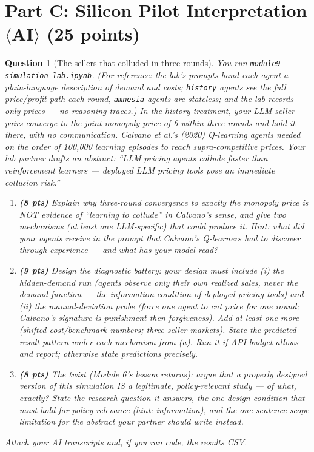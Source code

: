 \documentclass[11pt]{article}
\newtheorem{question}{Question}
\begin{document}
\section*{Part C: Silicon Pilot Interpretation $\langle$AI$\rangle$
(25 points)}

\begin{question}[The sellers that colluded in three rounds]
You run \texttt{module9-simulation-lab.ipynb}. (For reference: the
lab's prompts hand each agent a plain-language description of demand
and costs; \texttt{history} agents see the full price/profit path each
round, \texttt{amnesia} agents are stateless; and the lab records only
prices --- no reasoning traces.) In the history
treatment, your LLM seller pairs converge to the joint-monopoly price
of 6 within three rounds and hold it there, with no communication.
Calvano et al.'s (2020) Q-learning agents needed on the order of
100{,}000 learning episodes to reach supra-competitive prices. Your
lab partner drafts an abstract: ``LLM pricing agents collude faster
than reinforcement learners --- deployed LLM pricing tools pose an
immediate collusion risk.''

\begin{enumerate}[label=(\alph*)]
  \item \textbf{(8 pts)} Explain why three-round convergence to
        exactly the monopoly price is NOT evidence of ``learning to
        collude'' in Calvano's sense, and give two mechanisms (at
        least one LLM-specific) that could produce it. \emph{Hint:
        what did your agents receive in the prompt that Calvano's
        Q-learners had to discover through experience --- and what has
        your model read?}
  \item \textbf{(9 pts)} Design the diagnostic battery: your design
        must include (i) the \emph{hidden-demand} run (agents observe
        only their own realized sales, never the demand function ---
        the information condition of deployed pricing tools) and
        (ii) the \emph{manual-deviation probe} (force one agent to cut
        price for one round; Calvano's signature is
        punishment-then-forgiveness). Add at least one more (shifted
        cost/benchmark numbers; three-seller markets). State the
        predicted result pattern under each mechanism from (a). Run it
        if API budget allows and report; otherwise state predictions
        precisely.
  \item \textbf{(8 pts)} The twist (Module 6's lesson returns): argue
        that a properly designed version of this simulation IS a
        legitimate, policy-relevant study --- of what, exactly? State
        the research question it answers, the one design condition
        that must hold for policy relevance (hint: information), and
        the one-sentence scope limitation for the abstract your
        partner should write instead.
\end{enumerate}
Attach your AI transcripts and, if you ran code, the results CSV.
\end{question}
\end{document}
